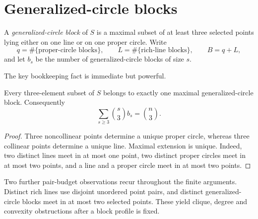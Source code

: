 \section{Generalized-circle blocks}

\begin{definition}
A \emph{generalized-circle block} of $S$ is a maximal subset of at least three selected points lying either on one line or on one proper circle.  Write
\[
 q=\#\{\text{proper-circle blocks}\},\qquad
 L=\#\{\text{rich-line blocks}\},\qquad B=q+L,
\]
and let $b_s$ be the number of generalized-circle blocks of size $s$.
\end{definition}

The key bookkeeping fact is immediate but powerful.

\begin{lemma}\label{lem:triplepartition}
Every three-element subset of $S$ belongs to exactly one maximal generalized-circle block.  Consequently
\begin{equation}\label{eq:triplepartition}
 \sum_{s\ge3}\binom{s}{3}b_s=\binom n3.
\end{equation}
\end{lemma}

\begin{proof}
Three noncollinear points determine a unique proper circle, whereas three collinear points determine a unique line.  Maximal extension is unique.  Indeed, two distinct lines meet in at most one point, two distinct proper circles meet in at most two points, and a line and a proper circle meet in at most two points.
\end{proof}

Two further pair-budget observations recur throughout the finite arguments.  Distinct rich lines use disjoint unordered point pairs, and distinct generalized-circle blocks meet in at most two selected points.  These yield clique, degree and convexity obstructions after a block profile is fixed.

